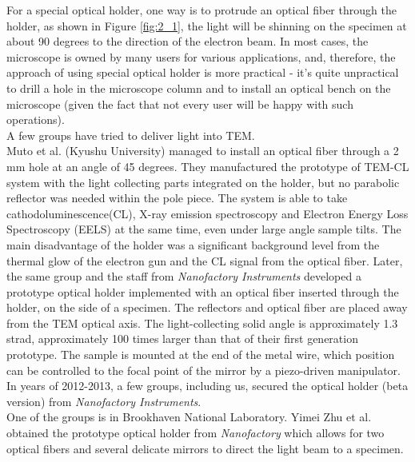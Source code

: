 For a special optical holder, one way is to protrude an optical fiber through the holder, as shown in Figure \ref{fig:2_1}, the light will be shinning on the specimen at about 90 degrees to the direction of the electron beam. In most cases, the microscope is owned by many users for various applications, and, therefore, the approach of using special optical holder is more practical - it's quite unpractical to drill a hole in the microscope column and to install an optical bench on the microscope (given the fact that not every user will be happy with such operations). \\
A few groups have tried to deliver light into TEM. \\
Muto et al. (Kyushu University) managed to install an optical fiber through a 2 mm hole at an angle of 45 degrees.\cite{Tanabe2002,Furumoto2013} They manufactured the prototype of TEM-CL system with the light collecting parts integrated on the holder, but no parabolic reflector was needed within the pole piece. The system is able to take cathodoluminescence(CL), X-ray emission spectroscopy and Electron Energy Loss Spectroscopy (EELS) at the same time, even under large angle sample tilts. The main disadvantage of the holder was a significant background level from the thermal glow of the electron gun and the CL signal from the optical fiber. Later, the same group and the staff from {\it Nanofactory Instruments} developed a prototype optical holder implemented with an optical fiber inserted through the holder, on the side of a specimen. The reflectors and optical fiber are placed away from the TEM optical axis. The light-collecting solid angle is approximately 1.3 strad, approximately 100 times larger than that of their first generation prototype. The sample is mounted at the end of the metal wire, which  position can be controlled to the focal point of the mirror by a piezo-driven manipulator. In years of 2012-2013, a few groups, including us, secured the optical holder (beta version) from {\it Nanofactory Instruments}. \\
One of the groups is in Brookhaven National Laboratory. Yimei Zhu et al. obtained the prototype optical holder from {\em Nanofactory} which allows for two optical fibers and several delicate mirrors to direct the light beam to a specimen. \\

